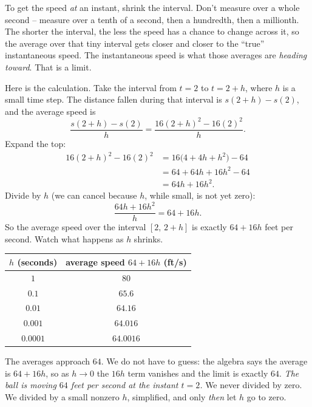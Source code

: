 \begin{intuitionbox}
To get the speed \emph{at} an instant, shrink the interval. Don't measure over a
whole second -- measure over a tenth of a second, then a hundredth, then a
millionth. The shorter the interval, the less the speed has a chance to change
across it, so the average over that tiny interval gets closer and closer to the
``true'' instantaneous speed. The instantaneous speed is what those averages are
\emph{heading toward}. That is a limit.
\end{intuitionbox}

Here is the calculation. Take the interval from $t = 2$ to
$t = 2 + h$, where $h$ is a small time step. The distance fallen during that
interval is $s(2 + h) - s(2)$, and the average speed is
\[
  \frac{s(2 + h) - s(2)}{h}
  = \frac{16(2 + h)^2 - 16(2)^2}{h}.
\]
Expand the top:
\begin{align*}
  16(2 + h)^2 - 16(2)^2
  &= 16\bigl(4 + 4h + h^2\bigr) - 64 \\
  &= 64 + 64h + 16h^2 - 64 \\
  &= 64h + 16h^2.
\end{align*}
Divide by $h$ (we can cancel because $h$, while
small, is not yet zero):
\[
  \frac{64h + 16h^2}{h} = 64 + 16h.
\]
So the average speed over the interval $[2,\, 2+h]$ is exactly $64 + 16h$ feet
per second. Watch what happens as $h$ shrinks.

\begin{center}
\begin{tabular}{cc}
\toprule
$h$ (seconds) & average speed $64 + 16h$ (ft/s) \\
\midrule
$1$        & $80$ \\
$0.1$      & $65.6$ \\
$0.01$     & $64.16$ \\
$0.001$    & $64.016$ \\
$0.0001$   & $64.0016$ \\
\bottomrule
\end{tabular}
\end{center}

The averages approach $64$. We do not have to guess: the algebra
says the average is $64 + 16h$, so as $h \to 0$ the $16h$ term vanishes and
the limit is exactly $64$. \emph{The ball is moving $64$ feet per second at the
instant $t = 2$.} We never divided by zero. We divided by a small nonzero $h$,
simplified, and only \emph{then} let $h$ go to zero.

